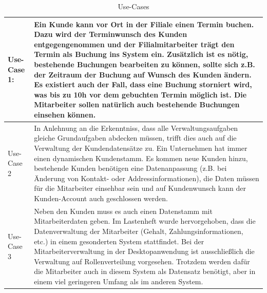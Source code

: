 \begin{table}[ht]

    \begin{onehalfspace}

    \begin{tabular}{l | p{12.5cm}}
        \hline
        Use-Case 1: & Ein Kunde kann vor Ort in der Filiale einen Termin buchen. Dazu wird der Terminwunsch des Kunden entgegengenommen und der Filialmitarbeiter trägt den Termin als Buchung ins System ein. Zusätzlich ist es nötig, bestehende Buchungen bearbeiten zu können, sollte sich z.B. der Zeitraum der Buchung auf Wunsch des Kunden ändern. Es existiert auch der Fall, dass eine Buchung storniert wird, was bis zu 10h vor dem gebuchten Termin möglich ist. Die Mitarbeiter sollen natürlich auch bestehende Buchungen einsehen können.\\
        \hline
        Use-Case 2 & In Anlehnung an die Erkenntniss, dass alle Verwaltungsaufgaben gleiche Grundaufgaben abdecken müssen, trifft dies auch auf die Verwaltung der Kundendatensätze zu. Ein Unternehmen hat immer einen dynamischen Kundenstamm. Es kommen neue Kunden hinzu, bestehende Kunden benötigen eine Datenanpassung (z.B. bei Änderung von Kontakt- oder Addressinformationen), die Daten müssen für die Mitarbeiter einsehbar sein und auf Kundenwunsch kann der Kunden-Account auch geschlossen werden.\\
        \hline
        Use-Case 3 & Neben den Kunden muss es auch einen Datenstamm mit Mitarbeiterdaten geben. Im Lastenheft wurde hervorgehoben, dass die Datenverwaltung der Mitarbeiter (Gehalt, Zahlungsinformationen, etc.) in einem gesonderten System stattfindet. Bei der Mitarbeiterverwaltung in der Desktopanwendung ist ausschließlich die Verwaltung auf Rollenverteilung vorgesehen. Trotzdem werden dafür die Mitarbeiter auch in diesem System als Datensatz benötigt, aber in einem viel geringeren Umfang als im anderen System.\\
        \hline
    \end{tabular}
    \caption{Use-Cases}
    \label{tbl:usecases1}

    \end{onehalfspace}
\end{table}

\clearpage

